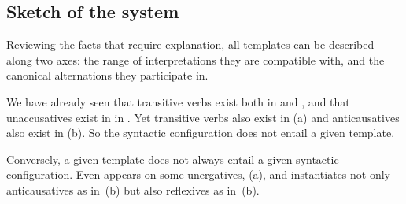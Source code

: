 \begin{exe}
\begin{xlist}
\begin{exe}
\begin{exe}
\begin{exe}
\begin{exe}
\begin{xlist}
\begin{exe}
\begin{xlist}
\begin{xlist}
\begin{xlist}
\begin{exe}
\begin{xlist}
\begin{exe}
\begin{exe}
\begin{exe}
\begin{exe}
\begin{xlist}
\begin{exe}
\begin{xlist}
\begin{exe}
\begin{exe}
\begin{xlist}
\begin{exe}
\begin{xlist}
\begin{exe}
\begin{xlist}
\begin{exe}
\begin{exe}
\begin{xlist}
\begin{exe}
\begin{exe}
\begin{xlist}
\begin{exe}
\begin{exe}
\begin{xlist}
\begin{exe}
\begin{exe}
\begin{xlist}
\begin{exe}
\begin{xlist}
\begin{exe}
\section{Sketch of the system} \label{intro:sketch}
Reviewing the facts that require explanation, all templates can be described along two axes: the range of interpretations they are compatible with, and the canonical alternations they participate in.

We have already seen that transitive verbs exist both in {\tkal} and {\thif}, and that unaccusatives exist in in {\tnif}. Yet transitive verbs also exist in {\tpie} (\nextx a) and anticausatives also exist in {\thit} (\nextx b). So the syntactic configuration does not entail a given template.
 \begin{exe}
\ex \label{ex:counter1} 
 \z 

Conversely, a given template does not always entail a given syntactic configuration. Even {\tnif} appears on some unergatives, (\nextx a), and {\thit} instantiates not only anticausatives as in~(\lastx b) but also reflexives as in~(\nextx b).
 \begin{exe}
\ex \label{ex:counter2} 
 \z 


\end{exe}
\end{exe}
\end{exe}
\end{xlist}
\end{exe}
\end{xlist}
\end{exe}
\end{exe}
\end{xlist}
\end{exe}
\end{exe}
\end{xlist}
\end{exe}
\end{exe}
\end{xlist}
\end{exe}
\end{exe}
\end{xlist}
\end{exe}
\end{xlist}
\end{exe}
\end{xlist}
\end{exe}
\end{exe}
\end{xlist}
\end{exe}
\end{xlist}
\end{exe}
\end{exe}
\end{exe}
\end{exe}
\end{xlist}
\end{exe}
\end{xlist}
\end{xlist}
\end{xlist}
\end{exe}
\end{xlist}
\end{exe}
\end{exe}
\end{exe}
\end{exe}
\end{xlist}
\end{exe}

